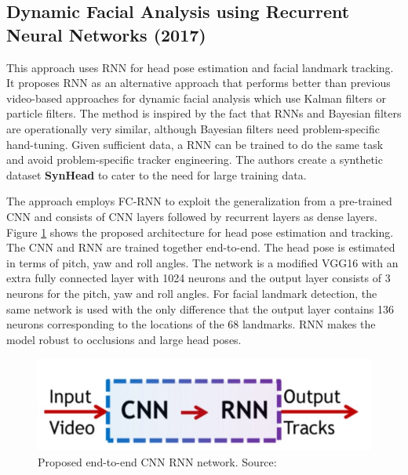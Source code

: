 \documentclass{llncs}
\begin{document}
\subsection{Dynamic Facial Analysis using Recurrent Neural Networks (2017) \cite{dynamic_facial_analysis}}
This approach uses RNN for head pose estimation and facial landmark tracking. 
It proposes RNN as an alternative approach that performs better than previous video-based approaches for dynamic facial analysis which use Kalman filters or particle filters. The method is inspired by the fact that RNNs and Bayesian filters are operationally very similar, although Bayesian filters need problem-specific hand-tuning. Given sufficient data, a RNN can be trained to do the same task and avoid problem-specific tracker engineering. 
The authors create a synthetic dataset \textbf{SynHead} to cater to the need for large training data. 

The approach employs FC-RNN to exploit the generalization from a pre-trained CNN and consists of CNN layers followed by recurrent layers as dense layers. Figure \ref{cnn_rnn} shows the proposed architecture for head pose estimation and tracking. The CNN and RNN are trained together end-to-end. The head pose is estimated in terms of pitch, yaw and roll angles. The network is a modified VGG16 with an extra fully connected layer with 1024 neurons and the output layer consists of 3 neurons for the pitch, yaw and roll angles. For facial landmark detection, the same network is used with the only difference that the output layer contains 136 neurons corresponding to the locations of the 68 landmarks. RNN makes the model robust to occlusions and large head poses.\\

\begin{figure}
\centering
\includegraphics[scale=0.3]{Media/cnn_rnn}
\caption{Proposed end-to-end CNN RNN network. Source:\cite{dynamic_facial_analysis}}
\label{cnn_rnn}
\end{figure}
\vspace{-1mm}
\end{document}
